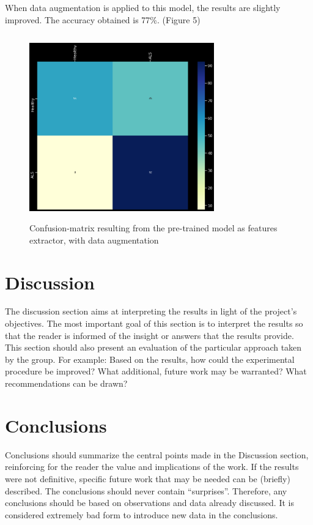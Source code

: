 When data augmentation is applied to this model, the results are slightly improved. The accuracy obtained is 77\%. (Figure 5)
\begin{figure}[H]
\centering
\caption{Confusion-matrix resulting from the pre-trained model as features extractor, with data augmentation}
\includegraphics[width=8cm, height=8cm]{extractor_data_augmentation_model_results}
\end{figure}


\section{Discussion}
The discussion section aims at interpreting the results in light of the project's objectives. The most important goal of this section is to interpret the results so that the reader is informed of the insight or answers that the results provide. This section should also present an evaluation of the particular approach taken by the group. For example: Based on the results, how could the experimental procedure be improved? What additional, future work may be warranted? What recommendations can be drawn?


\section{Conclusions}
Conclusions should summarize the central points made in the Discussion section, reinforcing for the reader the value and implications of the work. If the results were not definitive, specific future work that may be needed can be (briefly) described. The conclusions should never contain ``surprises''. Therefore, any conclusions should be based on observations and data already discussed. It is considered extremely bad form to introduce new data in the conclusions.

